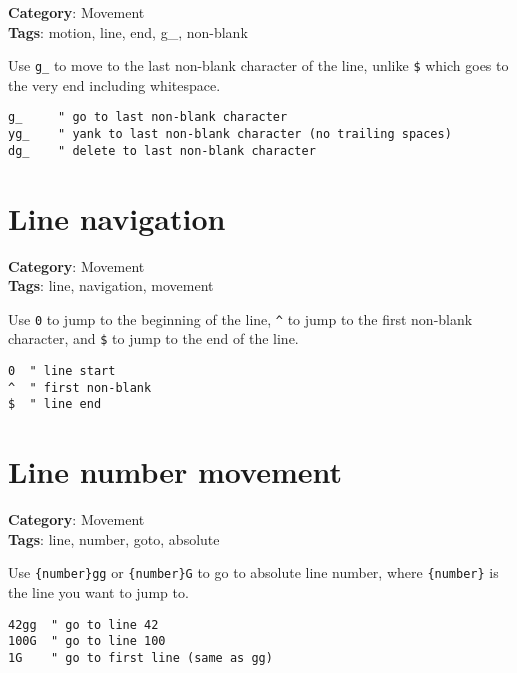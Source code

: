 {{{{{{{\textbf{Category}: Movement\\ \textbf{Tags}: motion, line, end, g\_, non-blank
\vspace{0.5cm}

Use {\footnotesize \Verb§g_§} to move to the last non-blank character of the line, unlike {\footnotesize \Verb§$§} which goes to the very end including whitespace.

\begin{Exa*}{}
\begin{Verbatim}[fontsize=\footnotesize, breaklines, breakanywhere]
g_     " go to last non-blank character
yg_    " yank to last non-blank character (no trailing spaces)
dg_    " delete to last non-blank character
\end{Verbatim}
\end{Exa*}

\section{Line navigation}

\textbf{Category}: Movement\\ \textbf{Tags}: line, navigation, movement
\vspace{0.5cm}

Use {\footnotesize \Verb§0§} to jump to the beginning of the line, {\footnotesize \Verb§^§} to jump to the first non-blank character, and {\footnotesize \Verb§$§} to jump to the end of the line.

\begin{Exa*}{}
\begin{Verbatim}[fontsize=\footnotesize, breaklines, breakanywhere]
0  " line start
^  " first non-blank
$  " line end
\end{Verbatim}
\end{Exa*}

\section{Line number movement}

\textbf{Category}: Movement\\ \textbf{Tags}: line, number, goto, absolute
\vspace{0.5cm}

Use {\footnotesize \Verb§{number}gg§} or {\footnotesize \Verb§{number}G§} to go to absolute line number, where {\footnotesize \Verb§{number}§} is the line you want to jump to.

\begin{Exa*}{}
\begin{Verbatim}[fontsize=\footnotesize, breaklines, breakanywhere]
42gg  " go to line 42
100G  " go to line 100
1G    " go to first line (same as gg)
\end{Verbatim}
\end{Exa*}

}}}}}}}
